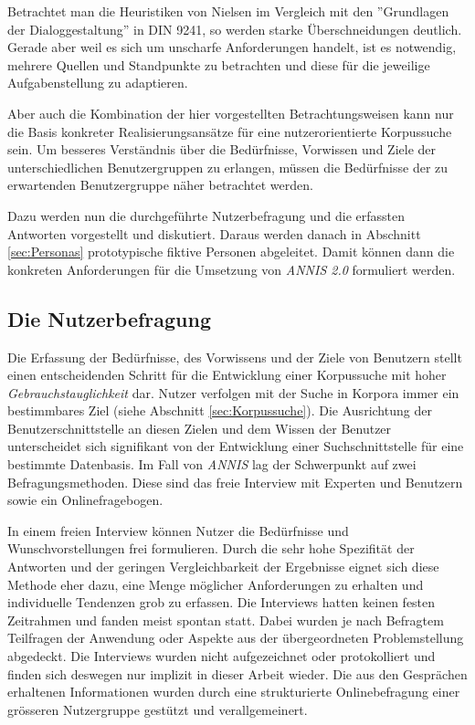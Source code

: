 Betrachtet man die Heuristiken von Nielsen im Vergleich mit den ''Grundlagen der Dialoggestaltung'' in DIN 9241, so werden starke Überschneidungen deutlich. Gerade aber weil es sich um unscharfe Anforderungen handelt, ist es notwendig, mehrere Quellen und Standpunkte zu betrachten und diese für die jeweilige Aufgabenstellung zu adaptieren.

Aber auch die Kombination der hier vorgestellten Betrachtungsweisen kann nur die Basis konkreter Realisierungsansätze für eine nutzerorientierte Korpussuche sein. Um besseres Verständnis über die Bedürfnisse, Vorwissen und Ziele der unterschiedlichen Benutzergruppen zu erlangen, müssen die Bedürfnisse der zu erwartenden Benutzergruppe näher betrachtet werden.

Dazu werden nun die durchgeführte Nutzerbefragung und die erfassten Antworten vorgestellt und diskutiert. Daraus werden danach in Abschnitt \ref{sec:Personas} prototypische fiktive Personen abgeleitet. Damit können dann die konkreten Anforderungen für die Umsetzung von \emph{ANNIS 2.0} formuliert werden. 

\newpage
\subsection{Die Nutzerbefragung}\label{sec:Nutzerbefragung}

Die Erfassung der Bedürfnisse, des Vorwissens und der Ziele von Benutzern stellt einen entscheidenden Schritt für die Entwicklung einer Korpussuche mit hoher \emph{Gebrauchstauglichkeit} dar. Nutzer verfolgen mit der Suche in Korpora immer ein bestimmbares Ziel (siehe Abschnitt \ref{sec:Korpussuche}). Die Ausrichtung der Benutzerschnittstelle an diesen Zielen und dem Wissen der Benutzer unterscheidet sich signifikant von der Entwicklung einer Suchschnittstelle für eine bestimmte Datenbasis. Im Fall von \emph{ANNIS} lag der Schwerpunkt auf zwei Befragungsmethoden. Diese sind das freie Interview mit Experten und Benutzern sowie ein Onlinefragebogen.

In einem freien Interview können Nutzer die Bedürfnisse und Wunschvorstellungen frei formulieren. Durch die sehr hohe Spezifität der Antworten und der geringen Vergleichbarkeit der Ergebnisse eignet sich diese Methode eher dazu, eine Menge möglicher Anforderungen zu erhalten und individuelle Tendenzen grob zu erfassen. Die Interviews hatten keinen festen Zeitrahmen und fanden meist spontan statt. Dabei wurden je nach Befragtem Teilfragen der Anwendung oder Aspekte aus der übergeordneten Problemstellung abgedeckt. Die Interviews wurden nicht aufgezeichnet oder protokolliert und finden sich deswegen nur implizit in dieser Arbeit wieder. Die aus den Gesprächen erhaltenen Informationen wurden durch eine strukturierte Onlinebefragung einer grösseren Nutzergruppe gestützt und verallgemeinert. 

